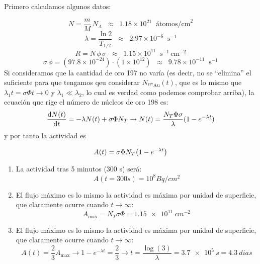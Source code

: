 Primero calculamos algunos datos: 

\begin{equation}
N = \frac{m}{M} \, N_A \;\;\approx\;\; 1.18 \times 10^{21} \;\; \text{átomos/cm}^2
\end{equation}
\begin{equation}
\lambda = \frac{\ln 2}{T_{1/2}} \;\;\approx\;\; 2.97 \times 10^{-6} \;\; \text{s}^{-1}
\end{equation}
\begin{equation}
R = N \, \phi \, \sigma \;\;\approx\;\; 1.15 \times 10^{11} \;\; \text{s}^{-1}\,\text{cm}^{-2}
\end{equation}
\begin{equation}
\sigma \, \phi = (97.8 \times 10^{-24}) \cdot (1 \times 10^{12}) \;\;\approx\;\; 9.78 \times 10^{-11} \;\; \text{s}^{-1}
\end{equation}
Si consideramos que la cantidad de oro 197 no varía (es decir, no se ``elimina'' el suficiente para que tengamos qeu considerar $N_{^{197}\text{Au}}(t)$, que es lo mismo que $\lambda_1 t= \sigma \Phi t \to 0$ y $\lambda_1\ll \lambda_2$, lo cual es verdad como podemos comprobar arriba), la ecuación que rige el número de núcleos de oro 198 es:
\begin{equation}
\dv{N(t)}{t} = - \lambda N(t) +  \sigma \Phi N_T \to  N(t) = \frac{N_T \Phi \sigma}{\lambda} (1-e^{-\lambda t})
\end{equation}
y por tanto la actividad es 

\begin{equation}
    A(t) = \sigma \Phi N_T \pqty{1-e^{-\lambda t}}
\end{equation}
\begin{enumerate}[label=\alph*)]
    \item La actividad tras 5 minutos (300 s) será: 
    \begin{equation}
        A(t=300\unit{s}) = 10^8 \unit{Bq/cm^2}
    \end{equation}
    \item El flujo máximo es lo mismo la actividad es máxima por unidad de superficie, que claramente ocurre cuando $t\to \infty$:
    \begin{equation}
        A_{\max} = N_T \sigma \Phi =  \SI{1.15e11}{cm^{-2}}
    \end{equation}
    \item El flujo máximo es lo mismo la actividad es máxima por unidad de superficie, que claramente ocurre cuando $t\to \infty$:
    \begin{equation}
        A (t)=  \frac{2}{3} A_{\max} \to 1-e^{-\lambda t} = \frac{2}{3} \to t = \frac{\log(3)}{\lambda} = \SI{3.7e5}{s} = \SI{4.3}{dias}
    \end{equation}
\end{enumerate}


